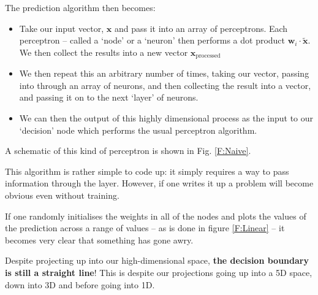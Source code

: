 \documentclass[a4paper,openany,11pt]{book}
\renewcommand\vec[1]{\boldsymbol{\mathbf{#1}}}
\begin{document}
				The prediction algorithm then becomes:
				\begin{itemize}
					\item Take our input vector, $\vec{x}$ and pass it into an array of perceptrons. Each perceptron -- called a `node' or a `neuron' then performs a dot product $\vec{w}_i \cdot \tilde{\vec{x}}$. We then collect the results into a new vector $\vec{x}_\text{processed}$
					\item We then repeat this an arbitrary number of times, taking our vector, passing into through an array of neurons, and then collecting the result into a vector, and passing it on to the next `layer' of neurons.
					\item We can then the output of this highly dimensional process as the input to our `decision' node which performs the usual perceptron algorithm.
				\end{itemize}
				A schematic of this kind of perceptron is shown in Fig. \ref{F:Naive}.

				This algorithm is rather simple to code up: it simply requires a way to pass information through the layer. However, if one writes it up a problem will become obvious even without training. 

				If one randomly initialises the weights in all of the nodes and plots the values of the prediction across a range of values -- as is done in figure \ref{F:Linear} -- it becomes very clear that something has gone awry.

				Despite projecting up into our high-dimensional space, \textbf{the decision boundary is still a straight line}! This is despite our projections going up into a 5D space, down into 3D and before going into 1D.
\end{document}
